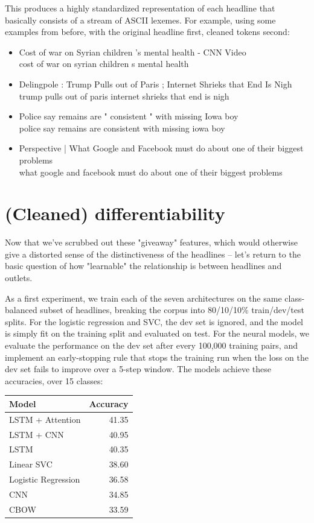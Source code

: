 \documentclass{scrartcl}
\begin{document}
This produces a highly standardized representation of each headline that basically consists of a stream of ASCII lexemes. For example, using some examples from before, with the original headline first, cleaned tokens second:

\begin{itemize}
\item Cost of war on Syrian children 's mental health - CNN Video\\
cost of war on syrian children s mental health

\item Delingpole : Trump Pulls out of Paris ; Internet Shrieks that End Is Nigh\\
trump pulls out of paris internet shrieks that end is nigh

\item Police say remains are " consistent " with missing Iowa boy\\
police say remains are consistent with missing iowa boy

\item Perspective | What Google and Facebook must do about one of their biggest problems\\
what google and facebook must do about one of their biggest problems
\end{itemize}

\section{(Cleaned) differentiability}

Now that we've scrubbed out these "giveaway" features, which would otherwise give a distorted sense of the distinctiveness of the headlines -- let's return to the basic question of how "learnable" the relationship is between headlines and outlets.

As a first experiment, we train each of the seven architectures on the same class-balanced subset of headlines, breaking the corpus into 80/10/10\% train/dev/test splits. For the logistic regression and SVC, the dev set is ignored, and the model is simply fit on the training split and evaluated on test. For the neural models, we evaluate the performance on the dev set after every 100,000 training pairs, and implement an early-stopping rule that stops the training run when the loss on the dev set fails to improve over a 5-step window. The models achieve these accuracies, over 15 classes:

\begin{table}[H]
\centering
\begin{tabular}{lr}
 \toprule
 Model & Accuracy\\
 \midrule
 LSTM + Attention & 41.35 \\
 LSTM + CNN & 40.95 \\
 LSTM & 40.35 \\
 Linear SVC & 38.60 \\
 Logistic Regression & 36.58 \\
 CNN & 34.85 \\
 CBOW & 33.59 \\
 \bottomrule
\end{tabular}
\end{table}
\end{document}
